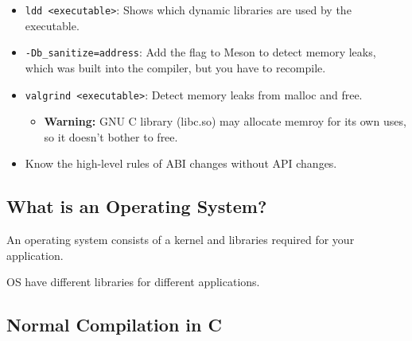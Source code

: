 \begin{summary}
    \begin{itemize}
        \item \texttt{ldd <executable>}: Shows which dynamic libraries are used by the executable.
        \item \texttt{-Db\_sanitize=address}: Add the flag to Meson to detect memory leaks, which was built into the compiler, but you have to recompile.
        \item \texttt{valgrind <executable>}: Detect memory leaks from malloc and free. 
        \begin{itemize}
            \item \textbf{Warning:} GNU C library (libc.so) may allocate memroy for its own uses, so it doesn't bother to free.
        \end{itemize}
    \end{itemize}
    \vspace{1em}

    \begin{itemize}
        \item Know the high-level rules of ABI changes without API changes.
    \end{itemize}
\end{summary}

\begin{faq}

\end{faq}

\subsection{What is an Operating System?}
\begin{definition}
    An operating system consists of a kernel and libraries required for your application.
\end{definition}

\begin{warning}
    OS have different libraries for different applications.
\end{warning}

\subsection{Normal Compilation in C}
\begin{definition}
\end{definition}

